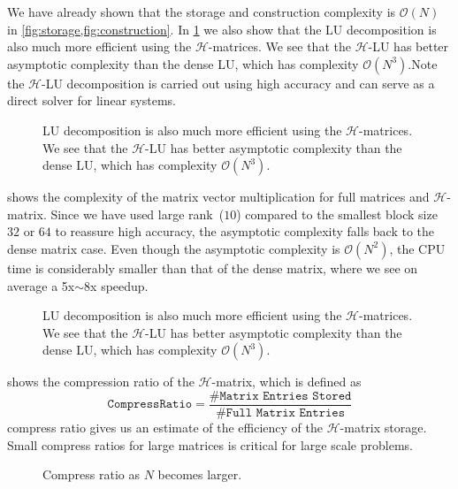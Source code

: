 \documentclass[10pt,a4paper]{article}
\theoremstyle{definition}
\begin{document}
We have already shown that the storage and construction complexity is $\mathcal{O}(N)$ in \cref{fig:storage,fig:construction}. In \cref{fig:lu} we also show that the LU decomposition is also much more efficient using the $\mathcal{H}$-matrices. We see that the $\mathcal{H}$-LU has better asymptotic complexity than the dense LU, which has complexity $\mathcal{O}(N^3)$.Note the $\mathcal{H}$-LU decomposition is carried out using high accuracy and can serve as a direct solver for linear systems. 

\begin{figure}[htpb]
\centering
\scalebox{0.6}{}
\caption{LU decomposition is also much more efficient using the $\mathcal{H}$-matrices. We see that the $\mathcal{H}$-LU has better asymptotic complexity than the dense LU, which has complexity $\mathcal{O}(N^3)$.}
\label{fig:lu}
\end{figure}

 shows the complexity of the matrix vector multiplication for full matrices and $\mathcal{H}$-matrix. Since we have used large rank~($10$) compared to the smallest block size $32$ or $64$ to reassure high accuracy, the asymptotic complexity falls back to the dense matrix case. Even though the asymptotic complexity is $\mathcal{O}(N^2)$, the CPU time is considerably smaller than that of the dense matrix, where we see on average a 5x$\sim$8x speedup. 

\begin{figure}[htpb]
\centering
\scalebox{0.6}{}
\caption{LU decomposition is also much more efficient using the $\mathcal{H}$-matrices. We see that the $\mathcal{H}$-LU has better asymptotic complexity than the dense LU, which has complexity $\mathcal{O}(N^3)$.}
\label{fig:matvec}
\end{figure}

 shows the compression ratio of the $\mathcal{H}$-matrix, which is defined as
\begin{equation}
\texttt{CompressRatio}=\frac{\#\texttt{Matrix Entries Stored}}{\#\texttt{Full Matrix Entries}}
\end{equation}
compress ratio gives us an estimate of the efficiency of the $\mathcal{H}$-matrix storage. Small compress ratios for large matrices is critical for large scale problems. 

\begin{figure}[htpb]
\centering
\scalebox{0.6}{}
\caption{Compress ratio as $N$ becomes larger.}
\label{fig:compress}
\end{figure}
\end{document}
